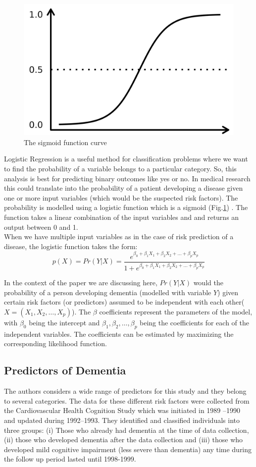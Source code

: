 \documentclass[12pt,letterpaper]{article}
\begin{document}
\begin{figure}
\vspace{-7 mm}
\includegraphics[width=7 cm]{sigmoid.png}
\caption{The sigmoid function curve}
\label{dvdr}
\end{figure}
Logistic Regression is a useful method for classification problems where we want to find the probability of a variable belongs to a particular category. So, this analysis is best for predicting binary outcomes like yes or no. In medical research this could translate into the probability of a patient developing a disease given one or more input variables (which would be the suspected risk factors). The probability is modelled using a logistic function which is a sigmoid (Fig.\ref{dvdr}) . The function takes a linear combination of the input variables and  and returns an output between 0 and 1. \\

When we have multiple input variables as in the case of risk prediction of a disease, the logistic function takes the form:
\begin{equation}
p(X) =Pr (Y|X)= \frac{e^{\beta_0+\beta_1X_1+\beta_2X_2+...+\beta_pX_p}}{1+e^{\beta_0+\beta_1X_1+\beta_2X_2+...+\beta_pX_p}}
\end{equation}

In the context of the paper we are discussing here, $Pr (Y|X)$ would the probability of a person developing dementia (modelled with variable $Y$) given certain risk factors (or predictors) assumed to be independent with each other($X=(X_1,X_2,\dots,X_p)$). The $\beta$ coefficients represent the parameters of the model, with $\beta_0$ being the intercept and $\beta_1,\beta_2,\dots,\beta_p$ being the coefficients for each of the independent variables. The coefficients can be estimated by maximizing the corresponding likelihood function.  

\subsection{Predictors of Dementia}
The authors considers a wide range of predictors for this study and they belong to several categories. The data for these different risk factors were collected from the Cardiovascular Health Cognition Study which was initiated in 1989 –1990 and updated during 1992–1993. They identified and classified individuals into three groups: (i) Those who already had dementia at the time of data collection, (ii) those who developed dementia after the data collection and (iii) those who developed mild cognitive impairment (less severe than dementia) any time during the follow up period lasted until 1998-1999.
\end{document}
